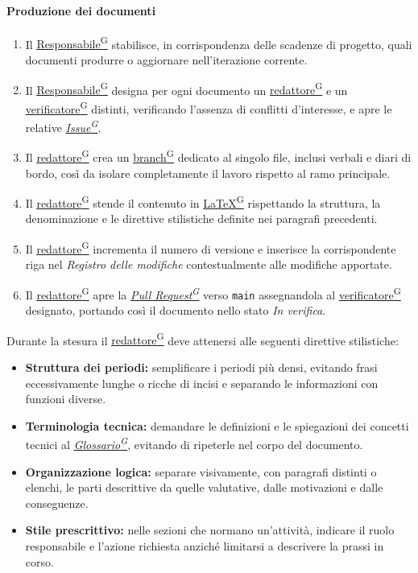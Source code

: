 \documentclass[a4paper,12pt]{article}
\providecommand{\glslink}[2]{\href{https://alittlebyte-19.github.io/Documentazione/glossario.html\#gls-#1}{\underline{#2}\textsuperscript{\scriptsize G}}}
\begin{document}
\paragraph{Produzione dei documenti}
\begin{enumerate}
    \item Il \glslink{responsabile}{Responsabile} stabilisce, in corrispondenza delle scadenze di progetto, quali documenti produrre o aggiornare nell'iterazione corrente.
    \item Il \glslink{responsabile}{Responsabile} designa per ogni documento un \glslink{redattore}{redattore} e un \glslink{verificatore}{verificatore} distinti, verificando l'assenza di conflitti d'interesse, e apre le relative \textit{\glslink{issue}{Issue}}.
    \item Il \glslink{redattore}{redattore} crea un \glslink{branch}{branch} dedicato al singolo file, inclusi verbali e diari di bordo, così da isolare completamente il lavoro rispetto al ramo principale.
    \item Il \glslink{redattore}{redattore} stende il contenuto in \glslink{latex}{LaTeX} rispettando la struttura, la denominazione e le direttive stilistiche definite nei paragrafi precedenti.
    \item Il \glslink{redattore}{redattore} incrementa il numero di versione e inserisce la corrispondente riga nel \textit{Registro delle modifiche} contestualmente alle modifiche apportate.
    \item Il \glslink{redattore}{redattore} apre la \textit{\glslink{pull-request}{Pull Request}} verso \texttt{main} assegnandola al \glslink{verificatore}{verificatore} designato, portando così il documento nello stato \textit{In verifica}.
\end{enumerate}

Durante la stesura il \glslink{redattore}{redattore} deve attenersi alle seguenti direttive stilistiche:
\begin{itemize}
    \item \textbf{Struttura dei periodi:} semplificare i periodi più densi, evitando frasi eccessivamente lunghe o ricche di incisi e separando le informazioni con funzioni diverse.
    \item \textbf{Terminologia tecnica:} demandare le definizioni e le spiegazioni dei concetti tecnici al \textit{\glslink{glossario}{Glossario}}, evitando di ripeterle nel corpo del documento.
    \item \textbf{Organizzazione logica:} separare visivamente, con paragrafi distinti o elenchi, le parti descrittive da quelle valutative, dalle motivazioni e dalle conseguenze.
    \item \textbf{Stile prescrittivo:} nelle sezioni che normano un'attività, indicare il ruolo responsabile e l'azione richiesta anziché limitarsi a descrivere la prassi in corso.
\end{itemize}
\end{document}
